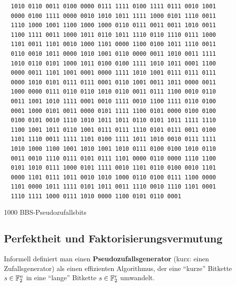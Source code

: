 \begin{refsegment}
\begin{table}[hbtp]
\begin{verbatim}
  1010 0110 0011 0100 0000 0111 1111 0100 1111 0111 0010 1001
  0000 0100 1111 0000 0010 1010 1011 1111 1000 0101 1110 0011
  1110 1000 1001 1100 1000 1000 0110 0111 0011 0011 1010 0011
  1100 1111 0011 1000 1011 0110 1011 1110 0110 1110 0111 1000
  1101 0011 1101 0010 1000 1101 0000 1100 0100 1011 1110 0011
  0110 0010 1011 0000 1010 1001 0110 0000 0011 1010 0011 1111
  1010 0110 0101 1000 1011 0100 0100 1111 1010 1011 0001 1100
  0000 0011 1101 1001 0001 0000 1111 1010 1001 0111 0111 0111
  0000 1010 0101 0111 0111 0001 0110 1001 0011 1011 0000 0011
  1000 0000 0111 0110 0110 1010 0110 0011 0111 1100 0010 0110
  0011 1001 1010 1111 0001 0010 1111 0010 1100 1111 0110 0100
  0001 1000 0101 0011 0000 0101 1111 1100 0101 0000 0100 0100
  0100 0101 0010 1110 1010 1011 1011 0110 0101 1011 1111 1110
  1100 1001 1011 0110 1001 0111 0111 1110 0101 0111 0011 0100
  1101 1110 0011 1111 1101 0100 1111 1011 1010 0010 0111 1111
  1010 1000 1100 1001 1010 1001 1010 0111 0100 0100 1010 0110
  0011 0010 1110 0111 0101 0111 1101 0000 0110 0000 1110 1100
  0101 1010 0111 1000 0101 1111 0010 1101 0110 0100 0010 1101
  0000 1101 0111 1011 0010 1010 1000 0110 0100 0111 1100 0000
  1101 0000 1011 1111 0101 1011 0011 1110 0010 1110 1101 0001
  1110 1111 1000 0111 1010 0000 1100 0101 0110 0001
\end{verbatim}
\caption{1000 BBS-Pseudozufallsbits} \label{tab-bool-bits1000}
\end{table}
\clearpage

\subsection{Perfektheit und Faktorisierungsvermutung}\label{ss-bool-perfqr}

Informell definiert man einen \textbf{Pseudozufallsgenerator}
(kurz: einen Zufallsgenerator)
als einen effizienten Algorithmus, der eine
"`kurze"' Bitkette $s \in \mathbb{F}_2^n$ in eine "`lange"' Bitkette
$s \in \mathbb{F}_2^r$ umwandelt.


\end{refsegment}
